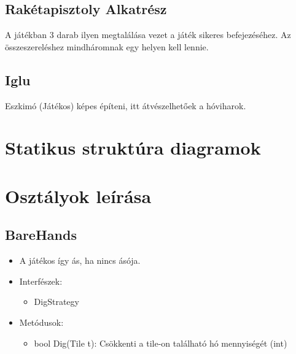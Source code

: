 \subsection{Rakétapisztoly Alkatrész}
A játékban 3 darab ilyen megtalálása vezet a játék sikeres befejezéséhez. Az összeszereléshez mindháromnak egy helyen kell lennie.

\subsection{Iglu}
Eszkimó (Játékos) képes építeni, itt átvészelhetőek a hóviharok.

\newpage
\section{Statikus struktúra diagramok}



\section{Osztályok leírása}

\subsection{BareHands}
\begin{itemize}
\item A játékos így ás, ha nincs ásója.\\

\item Interfészek:
	\begin{itemize}
		\item DigStrategy
	\end{itemize}

\item Metódusok:
	\begin{itemize}
		\item bool Dig(Tile t): Csökkenti a tile-on található hó mennyiségét (int)
	\end{itemize}
\end{itemize}

